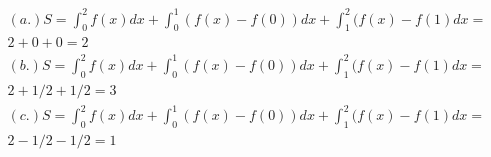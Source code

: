 \documentclass[10pt]{article}
\begin{document}
\begin{align*}(a.) S = \int_{0}^{2}f(x)dx + \int_{0}^{1}(f(x)-f(0))dx+ \int_{1}^{2}(f(x)-f(1)dx = &\\ 
2+0+0 = 2 \\
(b.) S = \int_{0}^{2}f(x)dx + \int_{0}^{1}(f(x)-f(0))dx+ \int_{1}^{2}(f(x)-f(1)dx =& \\
2+1/2+1/2 = 3 \\
(c.) S = \int_{0}^{2}f(x)dx + \int_{0}^{1}(f(x)-f(0))dx+ \int_{1}^{2}(f(x)-f(1)dx = &\\ 
2-1/2-1/2 = 1
\end{align*}
\end{document}
